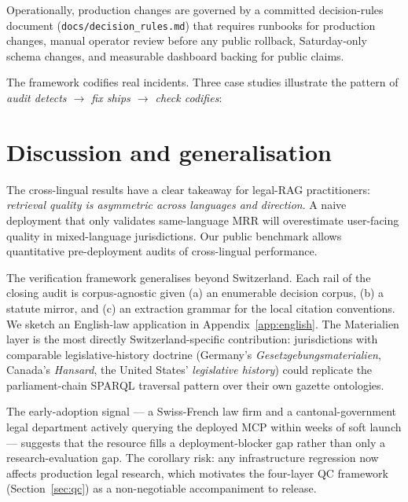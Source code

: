 \documentclass[11pt,a4paper]{article}
\begin{document}
Operationally, production changes are governed by a committed decision-rules document (\texttt{docs/decision\_rules.md}) that requires runbooks for production changes, manual operator review before any public rollback, Saturday-only schema changes, and measurable dashboard backing for public claims.

The framework codifies real incidents. Three case studies illustrate the pattern of \emph{audit detects $\to$ fix ships $\to$ check codifies}:



\section{Discussion and generalisation}\label{sec:disc}

The cross-lingual results have a clear takeaway for legal-RAG practitioners: \emph{retrieval quality is asymmetric across languages and direction}. A naive deployment that only validates same-language MRR will overestimate user-facing quality in mixed-language jurisdictions. Our public benchmark allows quantitative pre-deployment audits of cross-lingual performance.

The verification framework generalises beyond Switzerland. Each rail of the closing audit is corpus-agnostic given (a) an enumerable decision corpus, (b) a statute mirror, and (c) an extraction grammar for the local citation conventions. We sketch an English-law application in Appendix~\ref{app:english}. The Materialien layer is the most directly Switzerland-specific contribution: jurisdictions with comparable legislative-history doctrine (Germany's \emph{Gesetzgebungsmaterialien}, Canada's \emph{Hansard}, the United States' \emph{legislative history}) could replicate the parliament-chain SPARQL traversal pattern over their own gazette ontologies.

The early-adoption signal --- a Swiss-French law firm and a cantonal-government legal department actively querying the deployed MCP within weeks of soft launch --- suggests that the resource fills a deployment-blocker gap rather than only a research-evaluation gap. The corollary risk: any infrastructure regression now affects production legal research, which motivates the four-layer QC framework (Section~\ref{sec:qc}) as a non-negotiable accompaniment to release.
\end{document}
